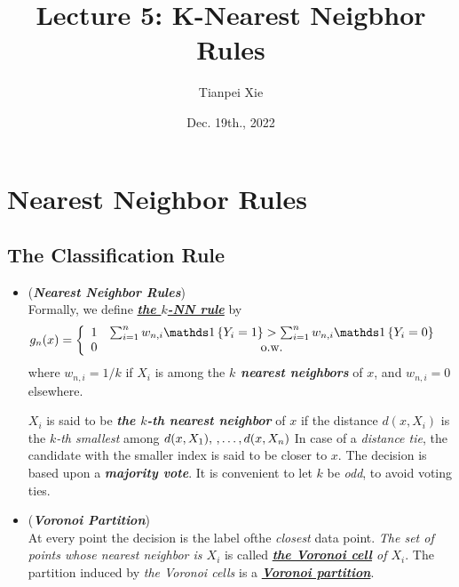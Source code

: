 \documentclass[11pt]{article}
\begin{document}
\title{Lecture 5: K-Nearest Neigbhor Rules}
\author{ Tianpei Xie}
\date{ Dec. 19th., 2022 }
\maketitle
\tableofcontents
\newpage
\section{Nearest Neighbor Rules}
\subsection{The Classification Rule}
\begin{itemize}
\item \begin{definition} (\emph{\textbf{Nearest Neighbor Rules}})\\
Formally, we define \underline{\emph{\textbf{the $k$-NN rule}}} by
\begin{align*}
g_n(x) &= \left\{\begin{array}{cc}
1 & \sum_{i=1}^{n}w_{n,i}\ind{Y_i = 1} > \sum_{i=1}^{n}w_{n,i}\ind{Y_i = 0}\\
0 & \text{o.w.}
\end{array}
\right.
\end{align*} where $w_{n,i} = 1/ k$ if $X_i$ is among the \emph{\textbf{$k$ nearest neighbors}} of $x$, and $w_{n,i} = 0$ elsewhere. 

$X_i$ is said to be \emph{\textbf{the $k$-th nearest neighbor}} of $x$ if the distance $d(x,X_i)$ is the \emph{$k$-th smallest} among $d(x,X_1), \,{,}\ldots{,}\, d(x,X_n)$  In case of a \emph{distance tie}, the candidate with the smaller index is said to be closer to $x$. The decision is based upon a \emph{\textbf{majority vote}}. It is convenient to let $k$ be \emph{odd}, to avoid voting ties. 
\end{definition}

\item \begin{remark} (\emph{\textbf{Voronoi Partition}}) \\
At every point the decision is the label ofthe \emph{closest} data point. \emph{The set of points whose nearest neighbor is $X_i$} is called \emph{\textbf{\underline{the Voronoi cell}} of $X_i$}. The partition induced by \emph{the Voronoi cells} is a \underline{\emph{\textbf{Voronoi partition}}}.   
\end{remark}



\end{itemize}
\end{document}
